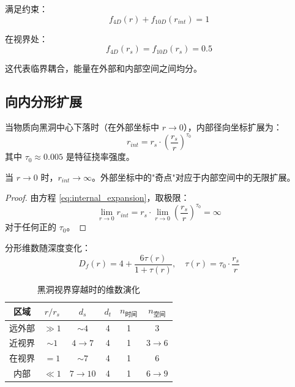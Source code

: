 满足约束：
\begin{equation}
    f_{4D}(r) + f_{10D}(r_{int}) = 1
\end{equation}

在视界处：
\begin{equation}
    f_{4D}(r_s) = f_{10D}(r_s) = 0.5
    \label{eq:horizon_energy_equipartition}
\end{equation}

这代表临界耦合，能量在外部和内部空间之间均分。

\subsection{向内分形扩展}

\begin{theorem}[向内分形扩展]
当物质向黑洞中心下落时（在外部坐标中 $r \to 0$），内部径向坐标扩展为：
\begin{equation}
    r_{int} = r_s \cdot \left(\frac{r_s}{r}\right)^{\tau_0}
    \label{eq:internal_expansion}
\end{equation}
其中 $\tau_0 \approx 0.005$ 是特征挠率强度。
\end{theorem}

\begin{corollary}[无限内空间]
当 $r \to 0$ 时，$r_{int} \to \infty$。外部坐标中的"奇点"对应于内部空间中的无限扩展。
\end{corollary}

\begin{proof}
由方程 \eqref{eq:internal_expansion}，取极限：
\begin{equation}
    \lim_{r \to 0} r_{int} = r_s \cdot \lim_{r \to 0} \left(\frac{r_s}{r}\right)^{\tau_0} = \infty
\end{equation}
对于任何正的 $\tau_0$。
\end{proof}

分形维数随深度变化：
\begin{equation}
    D_f(r) = 4 + \frac{6\tau(r)}{1 + \tau(r)}, \quad \tau(r) = \tau_0 \cdot \frac{r_s}{r}
\end{equation}

\begin{table}[htbp]
\centering
\caption{黑洞视界穿越时的维数演化}
\begin{tabular}{@{}cccccc@{}}
\toprule
区域 & $r/r_s$ & $d_s$ & $d_t$ & $n_{时间}$ & $n_{空间}$ \\
\midrule
远外部 & $\gg 1$ & $\sim 4$ & 4 & 1 & 3 \\
近视界 & $\sim 1$ & $4 \to 7$ & 4 & 1 & $3 \to 6$ \\
在视界 & $= 1$ & $\sim 7$ & 4 & 1 & 6 \\
内部 & $\ll 1$ & $7 \to 10$ & 4 & 1 & $6 \to 9$ \\
\bottomrule
\end{tabular}
\label{tab:dimensional_evolution}
\end{table}

